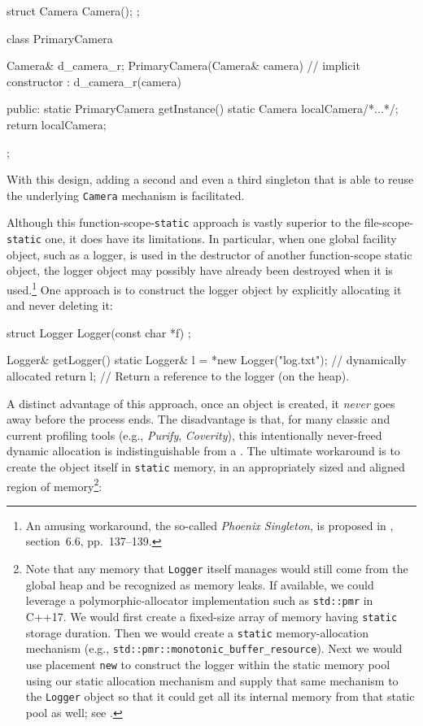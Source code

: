 \begin{emcppshiddenlisting}[emcppsbatch=e11]
struct Camera {
  Camera();
};
\end{emcppshiddenlisting}
\begin{emcppslisting}[emcppsbatch=e11]
class PrimaryCamera
{
    Camera& d_camera_r;
    PrimaryCamera(Camera& camera)  // implicit constructor
      : d_camera_r(camera) { }

public:
    static PrimaryCamera getInstance()
    {
        static Camera localCamera{/*...*/};
        return localCamera;
    }
};
\end{emcppslisting}

\noindent With this design, adding a second and even a third singleton that is
able to reuse the underlying \lstinline!Camera! mechanism is facilitated.

Although this function-scope-\lstinline!static! approach is vastly superior
to the file-scope-\lstinline!static! one, it does have its limitations. In
particular, when one global facility object, such as a logger, is used
in the destructor of another function-scope static object, the logger
object may possibly have already been destroyed when it is
used.\footnote{An amusing workaround, the so-called \emph{Phoenix
Singleton}, is proposed in \cite{alexandrescu01}, section~6.6, pp.~137--139.} One approach is to construct the logger object by
explicitly allocating it and never deleting it:

\begin{emcppshiddenlisting}[emcppsbatch={e12,e13,e16,e17}]
struct Logger {
  Logger(const char *f) {}
};
\end{emcppshiddenlisting}
\begin{emcppslisting}[emcppsbatch=e12]
Logger& getLogger()
{
    static Logger& l = *new Logger("log.txt");  // dynamically allocated
    return l;  // Return a reference to the logger (on the heap).
}
\end{emcppslisting}

\noindent A distinct advantage of this approach, once an object is created, it
\emph{never} goes away before the process ends. The disadvantage is
that, for many classic and current profiling tools (e.g., \emph{Purify},
\emph{Coverity}), this intentionally never-freed dynamic allocation is
indistinguishable from a . The ultimate workaround
is to create the object itself in \lstinline!static! memory, in an
appropriately sized and aligned region of memory{\cprotect\footnote{Note
that any memory that \lstinline!Logger! itself manages would still come
from the global heap and be recognized as memory leaks. If available,
we could leverage a polymorphic-allocator implementation such as
\lstinline!std::pmr! in C++17. We would first create a fixed-size array
of memory having \lstinline!static! storage duration. Then we would
create a \lstinline!static! memory-allocation mechanism (e.g.,
\lstinline!std::pmr::monotonic_buffer_resource!). Next we would use
placement \lstinline!new! to construct the logger within the static
memory pool using our static allocation mechanism and supply that same
mechanism to the \lstinline!Logger! object so that it could get all its
  internal memory from that static pool as well; see \cite{lakos22}.}}:

